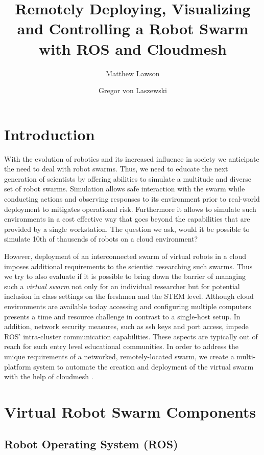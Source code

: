 \documentclass[9pt,twocolumn,twoside]{../../styles/osajnl}
\title{Remotely Deploying, Visualizing and Controlling a Robot Swarm with ROS and Cloudmesh}
\author[1]{Matthew Lawson}
\author[1,*]{Gregor von Laszewski}
\affil[1]{School of Informatics and Computing, Bloomington, IN 47408, U.S.A.}
\affil[*]{Corresponding authors: laszewski@gmail.com}
\begin{document}
\maketitle

\section{Introduction}
With the evolution of robotics and its increased influence in society we anticipate the need to deal with robot swarms. Thus, we need to educate the next generation of scientists by offering abilities to simulate a multitude and diverse set of robot swarms. Simulation allows safe interaction with the swarm while conducting actions and observing responses to its environment prior to real-world deployment to mitigates operational risk. Furthermore it allows to simulate such environments in a cost effective way that goes beyond the capabilities that are provided by a single workstation. The question we ask, would it be possible to simulate 10th of thausends of robots on a cloud environment?

However, deployment of an interconnected swarm of virtual robots in a cloud imposes additional requirements to the scientist researching such swarms. Thus we try to also evaluate if it is possible to bring down the barrier of managing such a {\em virtual swarm} not only for an individual researcher but for potential inclusion in class settings on the freshmen and the STEM level. Although cloud environments are available today accessing and configuring multiple computers presents a time and resource challenge in contrast to a single-host setup.  In addition, network security measures, such as ssh keys and port access, impede ROS' intra-cluster communication capabilities.  These aspects are typically out of reach for such entry level educational communities. In order to address the unique requirements of a networked, remotely-located swarm, we create a multi-platform system to automate the creation and deployment of the virtual swarm with the help of cloudmesh \cite{??}.

\section{Virtual Robot Swarm Components}

\subsection{Robot Operating System (ROS)} %
\end{document}
